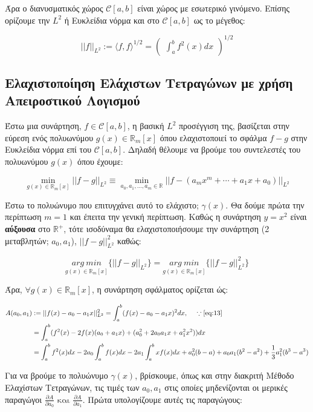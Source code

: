 \documentclass[12pt]{article}
\begin{document}
Άρα ο διανυσματικός χώρος \(\mathcal{C}[a,b]\) είναι χώρος με εσωτερικό
γινόμενο. Επίσης ορίζουμε την \(L^2\) ή Ευκλείδια νόρμα και στο
\(\mathcal{C}[a,b]\) ως το μέγεθος:

\[
||f||_{L^2} := \langle f,f \rangle^{1/2} = \begin{pmatrix} \int_a^b f^2(x)dx \end{pmatrix}^{1/2} \tag{7} \label{eq:13}
\]


\subsection{Eλαχιστοποίηση Ελάχιστων Τετραγώνων με χρήση Απειροστικού
Λογισμού}

Έστω μια συνάρτηση, \(f \in \mathcal{C}[a,b]\), η βασική \(L^2\)
προσέγγιση της, βασίζεται στην εύρεση ενός πολυωνύμου
\(g(x) \in \mathbb{R}_m[x]\) όπου ελαχιστοποιεί το σφάλμα \(f-g\) στην
Ευκλείδια νόρμα επί του \(\mathcal{C}[a,b]\). Δηλαδή θέλουμε να βρούμε
του συντελεστές του πολυωνύμου \(g(x)\) όπου έχουμε:

\[
\min_{g(x) \in \mathbb{R}_m[x]} ||f-g||_{L^2} \equiv \min_{a_0,a_1,\dots,a_m \in \mathbb{R}} ||f-(a_mx^m+\cdots+a_1x+a_0)||_{L^2} \nonumber
\]

Έστω το πολυώνυμο που επιτυγχάνει αυτό το ελάχιστο; \(\gamma(x)\). Θα
δούμε πρώτα την περίπτωση \(m=1\) και έπειτα την γενική περίπτωση. Καθώς
η συνάρτηση \(y=x^2\) είναι \textbf{αύξουσα} στο \(\mathbb{R}^+\), τότε
ισοδύναμα θα ελαχιστοποιήσουμε την συνάρτηση (2 μεταβλητών;
\(a_0,a_1\)), \(||f-g||_{L^2}^2\) καθώς:

\[
\underset{g(x) \in \mathbb{R}_m[x]}{arg \ min} \{||f-g||_{L^2}\} = \underset{g(x) \in \mathbb{R}_m[x]}{arg \ min} \{||f-g||_{L^2}^2\} \nonumber
\]

Άρα, \(\forall g(x) \in \mathbb{R}_m[x]\), η συνάρτηση σφάλματος
ορίζεται ώς:

\begin{align*}
A(a_0,a_1)&:=||f(x)-a_0-a_1x||_{L^2}^2 = \int_a^b (f(x)-a_0-a_1x)^2dx, \ \ \ \ \because \eqref{eq:13} \\
          &= \int_a^b (f^2(x)-2f(x)(a_0+a_1x)+(a_0^2+2a_0a_1x+a_1^2x^2))dx \\
          &= \int_a^b f^2(x)dx-2a_0\int_a^b f(x)dx-2a_1 \int_a^b xf(x)dx+a_0^2(b-a)+a_0a_1(b^2-a^2)+\frac{1}{3}a_1^2(b^3-a^3)
\end{align*}

Για να βρούμε το πολυώνυμο \(\gamma (x)\), βρίσκουμε, όπως και στην
διακριτή Μέθοδο Ελαχίστων Τετραγώνων, τις τιμές των \(a_0,a_1\) στις οποίες
μηδενίζονται οι μερικές παραγώγοι
\(\frac{\partial A}{\partial a_0} \text{ και } \frac{\partial A}{\partial a_1}\).
Πρώτα υπολογίζουμε αυτές τις παραγώγους:
\end{document}
